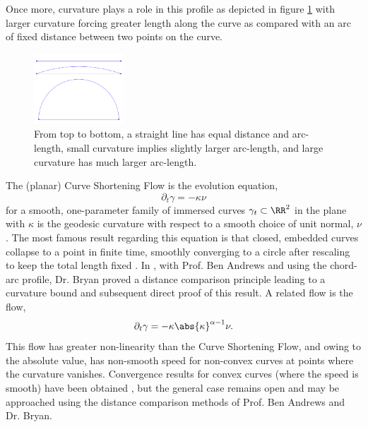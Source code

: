 \documentclass[12pt]{amsart}
\begin{document}
Once more, curvature plays a role in this profile as depicted in figure \ref{fg:chord_arc} with larger curvature forcing greater length along the curve as compared with an arc of fixed distance between two points on the curve.

\begin{figure}[htb]
\centering
\includegraphics[width=0.3\textwidth]{img/chord_arc.png}
\caption{\label{fg:chord_arc}
From top to bottom, a straight line has equal distance and arc-length, small curvature implies slightly larger arc-length, and large curvature has much larger arc-length.}
\end{figure}

The (planar) Curve Shortening Flow is the evolution equation,
\[
\partial_t \gamma = - \kappa\nu
\]
for a smooth, one-parameter family of immersed curves \(\gamma_t \subset \RR^2\) in the plane with \(\kappa\) is the geodesic curvature with respect to a smooth choice of unit normal, \(\nu\). The most famous result regarding this equation is that closed, embedded curves collapse to a point in finite time, smoothly converging to a circle after rescaling to keep the total length fixed \cite{MR840401,MR906392}. In \cite{MR2794630}, with Prof. Ben Andrews and using the chord-arc profile, Dr. Bryan proved a distance comparison principle leading to a curvature bound and subsequent direct proof of this result. A related flow is the flow,
\[
\partial_t \gamma = -\kappa\abs{\kappa}^{\alpha-1} \nu.
\]
This flow has greater non-linearity than the Curve Shortening Flow, and owing to the absolute value, has non-smooth speed for non-convex curves at points where the curvature vanishes. Convergence results for convex curves (where the speed is smooth) have been obtained \cite{MR1660843}, but the general case remains open and may be approached using the distance comparison methods of Prof. Ben Andrews and Dr. Bryan.
\end{document}
